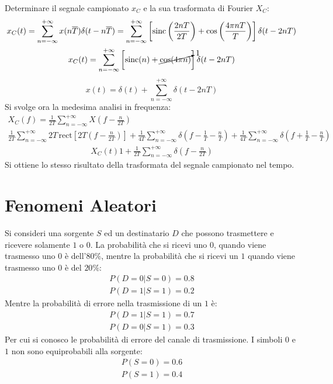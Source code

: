 \documentclass{article}
\begin{document}
Determinare il segnale campionato $x_C$ e la sua trasformata di Fourier $X_C$:
\begin{gather*}
    x_C(t)=\displaystyle\sum_{n=-\infty}^{+\infty}x(n\overline{T})\delta(t-n\overline{T})=\sum_{n=-\infty}^{+\infty}\left[\mbox{sinc}\left(\frac{2nT}{2T}\right)+\cos\left(\frac{4\pi nT}{T}\right)\right]\delta(t-2nT)\\
    x_C(t)=\displaystyle\sum_{n=-\infty}^{+\infty}\left[\mbox{sinc}(n)+\cancelto{1}{\cos(4\pi n)}\right]\delta(t-2nT)
\end{gather*}
\begin{equation}
    x(t)=\displaystyle\delta(t)+\sum_{n=-\infty}^{+\infty}\delta(t-2nT)
\end{equation}
Si svolge ora la medesima analisi in frequenza:
\begin{gather*}
    X_C(f)=\displaystyle\frac{1}{2T}\sum_{n=-\infty}^{+\infty}X\left(f-\frac{n}{2T}\right)\\
    \displaystyle\frac{1}{2T}\sum_{n=-\infty}^{+\infty}2T\,\mbox{rect}\left[2T\left(f-\frac{n}{2T}\right)\right]+\frac{1}{4T}\sum_{n=-\infty}^{+\infty}\delta\left(f-\frac{1}{T}-\frac{n}{T}\right)+\frac{1}{4T}\sum_{n=-\infty}^{+\infty}\delta\left(f+\frac{1}{T}-\frac{n}{T}\right)
\end{gather*}
\begin{gather}
    X_C(t)1+\displaystyle\frac{1}{2T}\sum_{n=-\infty}^{+\infty}\delta\left(f-\frac{n}{2T}\right)
\end{gather}
Si ottiene lo stesso risultato della trasformata del segnale campionato nel tempo. 

\clearpage

\section{Fenomeni Aleatori}

Si consideri una sorgente $S$ ed un destinatario $D$ che possono trasmettere e ricevere solamente $1$ o $0$. La probabilità che si ricevi uno $0$, 
quando viene trasmesso uno $0$ è dell'$80\%$, mentre la probabilità che si ricevi un $1$ quando viene trasmesso uno $0$ è del $20\%$:
\begin{gather*}
    P(D=0|S=0)=0.8\\
    P(D=1|S=1)=0.2
\end{gather*}
Mentre la probabilità di errore nella trasmissione di un $1$ è:
\begin{gather*}
    P(D=1|S=1)=0.7\\
    P(D=0|S=1)=0.3
\end{gather*}
Per cui si conosco le probabilità di errore del canale di trasmissione.
I simboli $0$ e $1$ non sono equiprobabili alla sorgente:
\begin{gather*}
    P(S=0)=0.6\\
    P(S=1)=0.4
\end{gather*}
\end{document}
